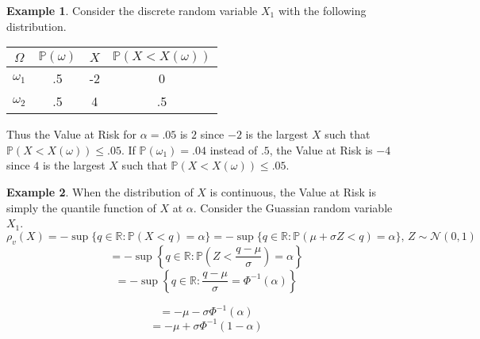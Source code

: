 \documentclass[12pt]{article}
\theoremstyle{definition}
\newtheorem{example}{Example}
\begin{document}
\begin{example}

Consider the discrete random variable \(X_1\) with the following distribution.

\begin{center}
\begin{tabular}{c| c c c}
\(\Omega\) & \(\mathbb{P}(\omega)\) & \(X\) & \(\mathbb{P}(X < X(\omega))\) \\
\hline
\(\omega_1\) & .5 & -2 & 0 \\
\(\omega_2\) & .5 & 4 & .5\\
\end{tabular}
\end{center}

Thus the Value at Risk for \(\alpha=.05\) is \(2\) since \(-2\) is the largest \(X\) such that \(\mathbb{P}(X < X(\omega))\leq .05\).  If \(\mathbb{P}(\omega_1)=.04\) instead of \(.5\), the Value at Risk is \(-4\) since \(4\) is the largest \(X\) such that \(\mathbb{P}(X < X(\omega))\leq .05\).
\end{example}

\begin{example}
When the distribution of \(X\) is continuous, the Value at Risk is simply the quantile function of \(X\) at \(\alpha\).  Consider the Guassian random variable \(X_1\). \[\rho_v(X)=-\sup{ \{q \in \mathbb{R}:\mathbb{P}(X< q) = \alpha \}} =  -\sup{ \{q \in \mathbb{R}:\mathbb{P}(\mu+\sigma Z < q) = \alpha \}}, \,Z \sim \mathcal{N}(0, 1)  \]
\[=-\sup{ \left\{q \in \mathbb{R}:\mathbb{P}\left(Z <\frac{q-\mu}{\sigma}\right) = \alpha \right\}}\]
\[=-\sup{ \left\{q \in \mathbb{R}:\frac{q-\mu}{\sigma} = \Phi^{-1}(\alpha) \right\}}\]

\[=-\mu-\sigma\Phi^{-1}(\alpha) \]
\[=-\mu+\sigma \Phi^{-1}(1-\alpha)\]
\end{example}
\end{document}
